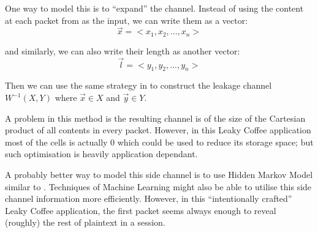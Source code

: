 One way to model this is to “expand” the channel. Instead of using the content at each packet from as the input, we can write them as a vector:
\begin{equation*}
\vec{x} = <x_1, x_2, ..., x_n>
\end{equation*}

and similarly, we can also write their length as another vector:
\begin{equation*}
\vec{l} = <y_1, y_2, ..., y_n>
\end{equation*}

Then we can use the same strategy in  to construct the leakage channel $W^{-1}(X, Y)$ where $\vec{x} \in X$ and $\vec{y} \in Y$. 

A problem in this method is the resulting channel is of the size of the Cartesian product of all contents in every packet. However, in this Leaky Coffee application most of the cells is actually $0$ which could be used to reduce its storage space; but such optimisation is heavily application dependant.

A probably better way to model this side channel is to use Hidden Markov Model\cite{baum1966} similar to \cite{Danezis_trafficanalysis}. Techniques of Machine Learning might also be able to utilise this side channel information more efficiently. However, in this “intentionally crafted” Leaky Coffee application, the first packet seems always enough to reveal (roughly) the rest of plaintext in a session.